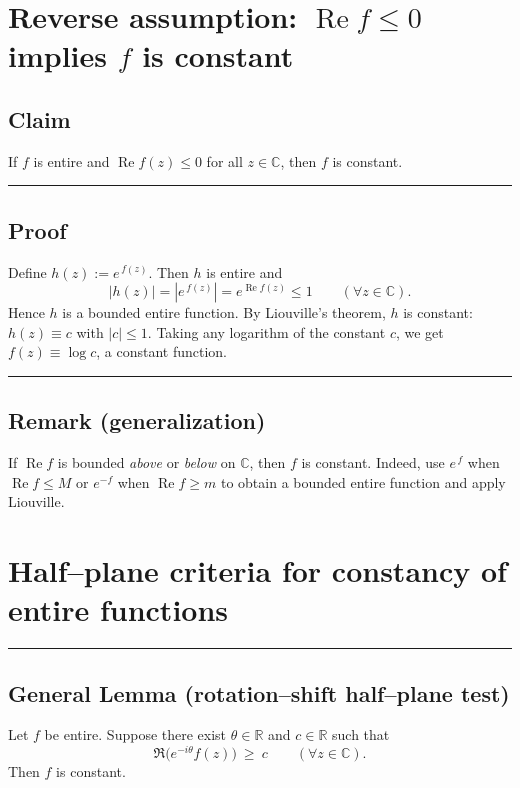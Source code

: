 \documentclass[11pt]{article}
\begin{document}
\section*{Reverse assumption: \(\operatorname{Re} f\le 0\) implies \(f\) is constant}

\subsection*{Claim}
If \(f\) is entire and \(\operatorname{Re} f(z)\le 0\) for all \(z\in\mathbb C\), then \(f\) is constant.

\bigskip\hrule\bigskip

\subsection*{Proof}
Define \(h(z):=e^{\,f(z)}\). Then \(h\) is entire and
\[
|h(z)|=|e^{\,f(z)}|=e^{\operatorname{Re} f(z)}\le 1\qquad(\forall z\in\mathbb C).
\]
Hence \(h\) is a bounded entire function. By Liouville’s theorem, \(h\) is constant:
\(h(z)\equiv c\) with \(|c|\le 1\).
Taking any logarithm of the constant \(c\), we get \(f(z)\equiv \log c\), a constant function.

\bigskip\hrule\bigskip

\subsection*{Remark (generalization)}
If \(\operatorname{Re} f\) is bounded \emph{above} or \emph{below} on \(\mathbb C\), then \(f\) is constant.
Indeed, use \(e^{\,f}\) when \(\operatorname{Re} f\le M\) or \(e^{-f}\) when \(\operatorname{Re} f\ge m\) to obtain a bounded entire function and apply Liouville.

\section*{Half–plane criteria for constancy of entire functions}

\bigskip\hrule\bigskip

\subsection*{General Lemma (rotation–shift half–plane test)}

Let $f$ be entire. Suppose there exist $\theta\in\mathbb{R}$ and $c\in\mathbb{R}$ such that
\[
\Re\!\big(e^{-i\theta} f(z)\big)\ \ge\ c \qquad (\forall z\in\mathbb{C}).
\]
Then $f$ is constant.
\end{document}
